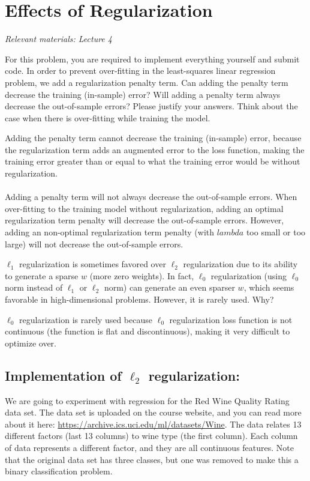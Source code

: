 \newpage
\section{Effects of Regularization}
\textit{Relevant materials: Lecture  4}

For this problem, you are required to implement everything yourself and submit code.
\indent\problem[4] %
In order to prevent over-fitting in the least-squares linear regression problem, we add a regularization penalty term.
Can adding the penalty term decrease the training (in-sample) error?
Will adding a penalty term always decrease the out-of-sample errors?
Please justify your answers. Think about the case when there is over-fitting while training the model.

Adding the penalty term cannot decrease the training (in-sample) error, because the regularization term adds an augmented error to the loss function, making the training error greater than or equal to what the training error would be without regularization.\\
\\
Adding a penalty term will not always decrease the out-of-sample errors. When over-fitting to the training model without regularization, adding an optimal regularization term penalty will decrease the out-of-sample errors. However, adding an non-optimal regularization term penalty (with $lambda$ too small or too large) will not decrease the out-of-sample errors.

\problem[4]
$\ell_1$ regularization is sometimes favored over $\ell_2$ regularization due to its ability to generate a sparse $w$ (more zero weights).
In fact, $\ell_0$ regularization (using $\ell_0$ norm instead of $\ell_1$ or $\ell_2$ norm) can generate an even sparser $w$, which seems favorable in high-dimensional problems.
However, it is rarely used.  Why?

$\ell_0$ regularization is rarely used because $\ell_0$ regularization loss function is not continuous (the function is flat and discontinuous), making it very difficult to optimize over.

\subsection{Implementation of \texorpdfstring{$\ell_2$}{L2} regularization:}

We are going to experiment with regression for the Red Wine Quality Rating data set. The data set is uploaded on the course website, and you can read more about it here: \url{https://archive.ics.uci.edu/ml/datasets/Wine}. The data relates 13 different factors (last 13 columns) to wine type (the first column). Each column of data represents a different factor, and they are all continuous features. Note that the original data set has three classes, but one was removed to make this a binary classification problem.

